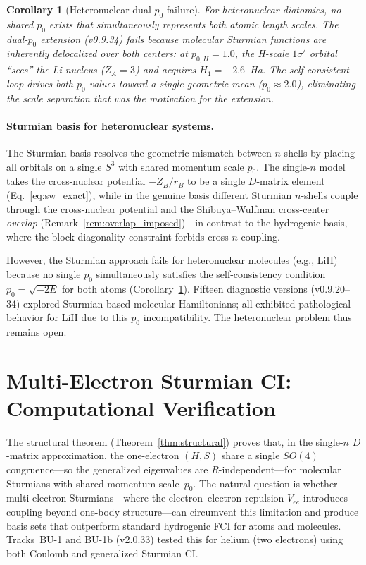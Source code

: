 \documentclass[aps,pra,twocolumn,superscriptaddress,longbibliography]{revtex4-2}
\newtheorem{corollary}{Corollary}
\theoremstyle{remark}
\theoremstyle{plain}
\begin{document}
\begin{corollary}[Heteronuclear dual-$p_0$ failure]
\label{cor:dual_p0}
For heteronuclear diatomics, no shared $p_0$ exists that simultaneously
represents both atomic length scales.  The dual-$p_0$ extension
(v0.9.34) fails because molecular Sturmian functions are inherently
delocalized over both centers: at $p_{0,H} = 1.0$, the H-scale
$1\sigma'$ orbital ``sees'' the Li nucleus ($Z_A = 3$) and acquires
$H_1 = -2.6$~Ha.  The self-consistent loop drives both $p_0$ values
toward a single geometric mean ($p_0 \approx 2.0$), eliminating the
scale separation that was the motivation for the extension.
\end{corollary}

\paragraph{Sturmian basis for heteronuclear systems.}
The Sturmian basis resolves the geometric mismatch between $n$-shells by
placing all orbitals on a single $S^3$ with shared momentum scale $p_0$.
The single-$n$ model takes the cross-nuclear potential $-Z_B/r_B$ to be
a single $D$-matrix element (Eq.~\eqref{eq:sw_exact}), while in the
genuine basis different Sturmian $n$-shells couple through the
cross-nuclear potential and the Shibuya--Wulfman cross-center
\emph{overlap} (Remark~\ref{rem:overlap_imposed})---in
contrast to the hydrogenic basis, where the block-diagonality constraint
forbids cross-$n$ coupling.

However, the Sturmian approach fails for heteronuclear molecules (e.g.,
LiH) because no single $p_0$ simultaneously satisfies the
self-consistency condition $p_0 = \sqrt{-2E}$ for both atoms
(Corollary~\ref{cor:dual_p0}).  Fifteen diagnostic versions
(v0.9.20--34) explored Sturmian-based molecular Hamiltonians; all
exhibited pathological behavior for LiH due to this $p_0$
incompatibility.  The heteronuclear problem thus remains open.


\section{Multi-Electron Sturmian CI: Computational Verification}
\label{sec:multi_electron}

The structural theorem (Theorem~\ref{thm:structural}) proves that, in
the single-$n$ $D$-matrix approximation, the one-electron $(H,S)$ share a
single $SO(4)$ congruence---so the generalized eigenvalues are
$R$-independent---for molecular Sturmians with shared momentum
scale~$p_0$.  The natural question is whether multi-electron
Sturmians---where the electron--electron repulsion $V_{ee}$ introduces
coupling beyond one-body structure---can circumvent this limitation and
produce basis sets that outperform standard hydrogenic FCI for atoms
and molecules.  Tracks~BU-1 and BU-1b (v2.0.33) tested this for
helium (two electrons) using both Coulomb and generalized Sturmian CI.
\end{document}
